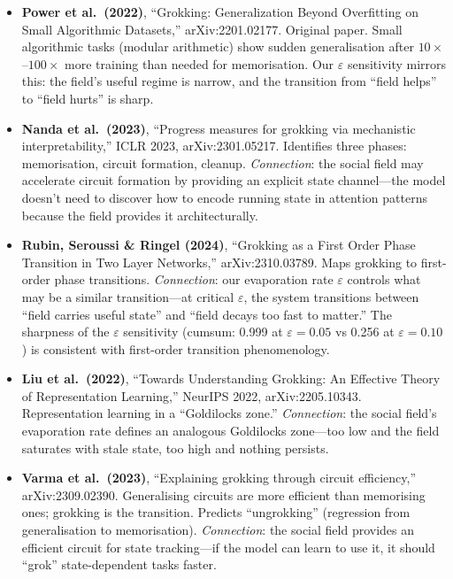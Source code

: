\documentclass[11pt,a4paper]{article}
\begin{document}
\begin{itemize}
    \item \textbf{Power et al.\ (2022)}, ``Grokking: Generalization
          Beyond Overfitting on Small Algorithmic Datasets,''
          arXiv:2201.02177.  Original paper.  Small algorithmic tasks
          (modular arithmetic) show sudden generalisation after
          $10\times$--$100\times$ more training than needed for
          memorisation.  Our $\varepsilon$ sensitivity mirrors this:
          the field's useful regime is narrow, and the transition from
          ``field helps'' to ``field hurts'' is sharp.

    \item \textbf{Nanda et al.\ (2023)}, ``Progress measures for
          grokking via mechanistic interpretability,'' ICLR 2023,
          arXiv:2301.05217.  Identifies three phases: memorisation,
          circuit formation, cleanup.  \emph{Connection}: the social
          field may accelerate circuit formation by providing an
          explicit state channel---the model doesn't need to discover
          how to encode running state in attention patterns because the
          field provides it architecturally.

    \item \textbf{Rubin, Seroussi \& Ringel (2024)}, ``Grokking as a
          First Order Phase Transition in Two Layer Networks,''
          arXiv:2310.03789.  Maps grokking to first-order phase
          transitions.  \emph{Connection}: our evaporation rate
          $\varepsilon$ controls what may be a similar transition---at
          critical $\varepsilon$, the system transitions between
          ``field carries useful state'' and ``field decays too fast to
          matter.''  The sharpness of the $\varepsilon$ sensitivity
          (cumsum: 0.999 at $\varepsilon = 0.05$ vs 0.256 at
          $\varepsilon = 0.10$) is consistent with first-order
          transition phenomenology.

    \item \textbf{Liu et al.\ (2022)}, ``Towards Understanding
          Grokking: An Effective Theory of Representation Learning,''
          NeurIPS 2022, arXiv:2205.10343.  Representation learning in a
          ``Goldilocks zone.''  \emph{Connection}: the social field's
          evaporation rate defines an analogous Goldilocks zone---too
          low and the field saturates with stale state, too high and
          nothing persists.

    \item \textbf{Varma et al.\ (2023)}, ``Explaining grokking through
          circuit efficiency,'' arXiv:2309.02390.  Generalising circuits
          are more efficient than memorising ones; grokking is the
          transition.  Predicts ``ungrokking'' (regression from
          generalisation to memorisation).  \emph{Connection}: the
          social field provides an efficient circuit for state
          tracking---if the model can learn to use it, it should
          ``grok'' state-dependent tasks faster.
\end{itemize}
\end{document}
